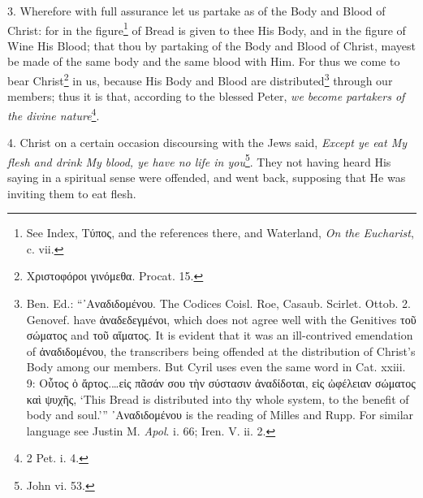 3. Wherefore with full assurance let us partake as of the Body and Blood of Christ: for in the figure\footnote{See Index, \textgreek{Τύπος}, and the references there, and Waterland, \emph{On the Eucharist}, c. vii.} of Bread is given to thee His Body, and in the figure of Wine His Blood; that thou by partaking of the Body and Blood of Christ, mayest be made of the same body and the same blood with Him. For thus we come to bear Christ\footnote{\textgreek{Χριστοφόροι γινόμεθα}. Procat. 15.} in us, because His Body and Blood are distributed\footnote{Ben. Ed.: “\textgreek{᾽Αναδιδομένου}. The Codices Coisl. Roe, Casaub. Scirlet. Ottob. 2. Genovef. have \textgreek{ἀναδεδεγμένοι}, which does not agree well with the Genitives \textgreek{τοῦ σώματος} and \textgreek{τοῦ αἵματος}. It is evident that it was an ill-contrived emendation of \textgreek{ἀναδιδομένου}, the transcribers being offended at the distribution of Christ’s Body among our members. But Cyril uses even the same word in Cat. xxiii. 9: \textgreek{Οὗτος ὁ ἄρτος.…εἰς πᾶσάν σου τὴν σύστασιν ἀναδίδοται, εἰς ὠφέλειαν σώματος καὶ ψυχῆς}, ‘This Bread is distributed into thy whole system, to the benefit of body and soul.’” \textgreek{᾽Αναδιδομένου} is the reading of Milles and Rupp. For similar language see Justin M. \emph{Apol}. i. 66; Iren. V. ii. 2.} through our members; thus it is that, according to the blessed Peter, \emph{we become partakers of the divine nature}\footnote{2 Pet. i. 4.}.

4. Christ on a certain occasion discoursing with the Jews said, \emph{Except ye eat My flesh and drink My blood, ye have no life in you}\footnote{John vi. 53.}. They not having heard His saying in a spiritual sense were offended, and went back, supposing that He was inviting them to eat flesh.

